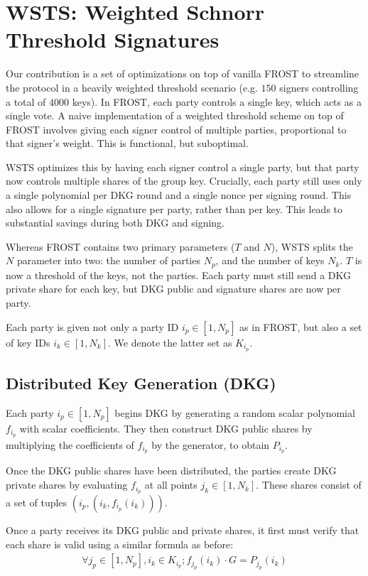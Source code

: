 \documentclass{article}
\theoremstyle{definition}
\theoremstyle{remark}
\begin{document}
\section{
  WSTS: Weighted Schnorr Threshold Signatures
}

Our contribution is a set of optimizations on top of vanilla FROST to streamline the protocol in a heavily weighted threshold scenario (e.g. $150$ signers controlling a total of $4000$ keys). In FROST, each party controls a single key, which acts as a single vote.  A naive implementation of a weighted threshold scheme on top of FROST involves giving each signer control of multiple parties, proportional to that signer's weight.  This is functional, but suboptimal.

WSTS optimizes this by having each signer control a single party, but that party now controls multiple shares of the group key.  Crucially, each party still uses only a single polynomial per DKG round and a single nonce per signing round.  This also allows for a single signature per party, rather than per key.  This leads to substantial savings during both DKG and signing.

Whereas FROST contains two primary parameters ($T$ and $N$), WSTS splits the $N$ parameter into two: the number of parties $N_p$, and the number of keys $N_k$.  $T$ is now a threshold of the keys, not the parties.  Each party must still send a DKG private share for each key, but DKG public and signature shares are now per party.

Each party is given not only a party ID $i_p \in [1, N_p]$ as in FROST, but also a set of key IDs $i_k \in [1, N_k]$.  We denote the latter set as $K_{i_p}$.

\subsection{
  Distributed Key Generation (DKG)
}

Each party $i_p \in [1, N_p]$ begins DKG by generating a random scalar polynomial $f_{i_p}$ with scalar coefficients.  They then construct DKG public shares by multiplying the coefficients of $f_{i_p}$ by the generator, to obtain $P_{i_p}$.

Once the DKG public shares have been distributed, the parties create DKG private shares by evaluating $f_{i_p}$ at all points $j_k \in [1, N_k]$.  These shares consist of a set of tuples $(i_p, (i_k, f_{i_p}(i_k)))$.

Once a party receives its DKG public and private shares, it first must verify that each share is valid using a similar formula as before:
\begin{align}
  \forall j_p \in [1,N_p], i_k \in K_{i_p}; f_{j_p}(i_k) \cdot G = P_{j_p}(i_k)
\end{align}
\end{document}

